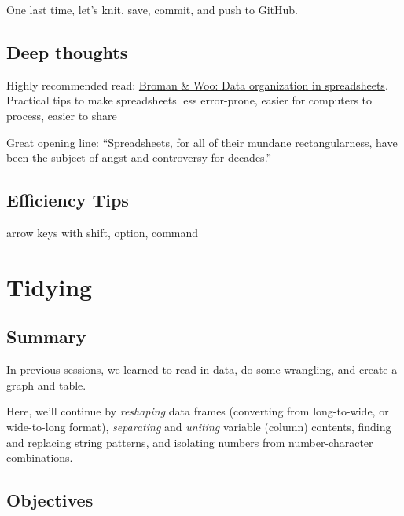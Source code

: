 \documentclass[]{book}
\begin{document}
One last time, let's knit, save, commit, and push to GitHub.

\hypertarget{deep-thoughts-1}{%
\section{Deep thoughts}\label{deep-thoughts-1}}

Highly recommended read: \href{https://peerj.com/preprints/3183/}{Broman \& Woo: Data organization in spreadsheets}. Practical tips to make spreadsheets less error-prone, easier for computers to process, easier to share

Great opening line: ``Spreadsheets, for all of their mundane rectangularness, have been the subject of angst and controversy for decades.''

\hypertarget{efficiency-tips-2}{%
\section{Efficiency Tips}\label{efficiency-tips-2}}

arrow keys with shift, option, command

\hypertarget{tidying}{%
\chapter{Tidying}\label{tidying}}

\hypertarget{summary-4}{%
\section{Summary}\label{summary-4}}

In previous sessions, we learned to read in data, do some wrangling, and create a graph and table.

Here, we'll continue by \emph{reshaping} data frames (converting from long-to-wide, or wide-to-long format), \emph{separating} and \emph{uniting} variable (column) contents, finding and replacing string patterns, and isolating numbers from number-character combinations.

\hypertarget{objectives-4}{%
\section{Objectives}\label{objectives-4}}
\end{document}
